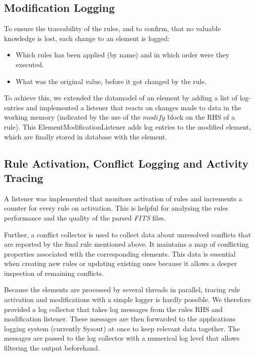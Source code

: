 \documentclass[a4paper,12pt]{article}
\begin{document}
\subsection{Modification Logging}

To ensure the traceability of the rules, and to confirm, that no valuable knowledge is lost, each change to an element is logged:
\begin{itemize}
\item Which rules has been applied (by name) and in which order were they executed.
\item What was the original value, before it got changed by the rule.
\end{itemize}

To achieve this, we extended the datamodel of an element by adding a list of log-entries and implemented a listener that reacts on changes made to data in the working memory (indicated by the use of the $modify$ block on the RHS of a rule). This ElementModificationListener adds log entries to the modified element, which are finally stored in database with the element.

\subsection{Rule Activation, Conflict Logging and Activity Tracing}

A listener was implemented that monitors activation of rules and increments a counter for every rule on activation. This is helpful for analysing the rules performance and the quality of the parsed \emph{FITS} files.

Further, a conflict collector is used to collect data about unresolved conflicts that are reported by the final rule mentioned above. It maintains a map of conflicting properties associated with the corresponding elements. This data is essential when creating new rules or updating existing ones because it allows a deeper inspection of remaining conflicts.

Because the elements are processed by several threads in parallel, tracing rule activation and modifications with a simple logger is hardly possible. We therefore provided a log collector that takes log messages from the rules RHS and modification listener. These messages are then forwarded to the applications logging system (currently Sysout) at once to keep relevant data together. The messages are passed to the log collector with a numerical log level that allows filtering the output beforehand.
\end{document}

